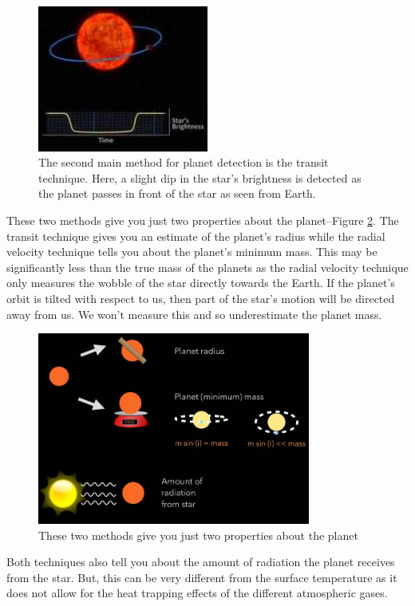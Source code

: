 \documentclass[]{article}
\begin{document}
\begin{figure}[H]
	\begin{center}
		\caption[The transit technique]{The second main method for planet detection is the transit technique. Here, a slight dip in the star's brightness is detected as the planet passes in front of the star as seen from Earth.}\label{fig:transit}
		\includegraphics[width=0.5\textwidth]{transit}
	\end{center}
\end{figure}

These two methods give you
just two properties about the planet--Figure \ref{fig:planet-properties}.
The transit technique gives you
an estimate of the planet's radius
while the radial velocity technique
tells you about the planet's
minimum mass.
This may be significantly less
than the true mass of the planets
as the radial velocity technique
only measures the wobble of the star
directly towards the Earth.
If the planet's orbit is tilted
with respect to us,
then part of the star's motion
will be directed away from us.
We won't measure this and so
underestimate the planet mass.

\begin{figure}[H]
	\begin{center}
		\caption{These two methods give you
		just two properties about the planet}\label{fig:planet-properties}
		\includegraphics[width=0.8\textwidth]{planet-properties}
	\end{center}
\end{figure}
Both techniques also tell you about
the amount of radiation
the planet receives from the star.
But, this can be very different
from the surface temperature
as it does not allow for
the heat trapping effects
of the different atmospheric gases.
\end{document}
